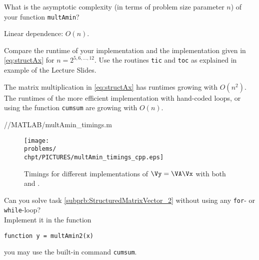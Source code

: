 \begin{problem}
\begin{subproblem}[3]
\end{subproblem}

\begin{subproblem}[1] \label{subprb:StructuredMatrixVector_3}
What is the asymptotic complexity (in terms of problem size parameter $n$) of your function \texttt{multAmin}?

\begin{solution}
Linear dependence: $O(n)$.
\end{solution}
%
\end{subproblem}


\begin{subproblem}[2] \label{subprb:StructuredMatrixVector_4}
Compare the runtime of your implementation and the implementation given in \eqref{eq:structAx} for $n=2^{5,6,\ldots,12}$.
Use the routines \texttt{tic} and \texttt{toc} as explained in example  of the Lecture Slides.

\begin{solution}

The matrix multiplication in \eqref{eq:structAx} has runtimes growing with $O(n^2)$.
The runtimes of the more efficient implementation with hand-coded loops, or using the \Matlab function \texttt{cumsum} are growing with $O(n)$.
%

{\problems/\chpt/MATLAB/multAmin_timings.m}
%
%

\begin{figure}[ht]
\centering
\label{fig:multAmin_timings}
\texttt{[image: \\problems/\\chpt/PICTURES/multAmin\_timings\_cpp.eps]}
\caption{Timings for different implementations of $\Vy=\VA\Vx$ with both \Matlab and \Cpp.}
\end{figure}

\end{solution}
\end{subproblem}

\begin{subproblem}[3] \label{subprb:StructuredMatrixVector_5}
Can you solve task \ref{subprb:StructuredMatrixVector_2} without using any \texttt{for}- or \texttt{while}-loop?\\
Implement it in the function
%
\begin{center}
\texttt{function y = multAmin2(x)}
\end{center}
%
\begin{hint}
 you may use the \Matlab built-in command \texttt{cumsum}.
\end{hint}


\end{subproblem}
\end{problem}
